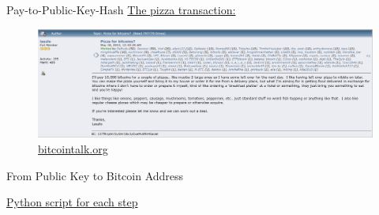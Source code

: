 \documentclass[]{beamer}
\begin{document}
%

\begin{frame}{Pay-to-Public-Key-Hash}
	\href{https://blockstream.info/tx/a1075db55d416d3ca199f55b6084e2115b9345e16c5cf302fc80e9d5fbf5d48d}{\link The pizza transaction:}\\
	\begin{figure}
	\includegraphics[scale=0.3]{../assets/images/pizza_blogpost}	
	\caption*{\href{https://bitcointalk.org/index.php?topic=137.0}{\link bitcointalk.org}}
	\end{figure}
\end{frame}

\begin{frame}{From Public Key to Bitcoin Address}
\vspace{-0.5em}
\begin{figure}
	
\end{figure}
\vspace{-1em}
\scriptsize
\href{https://github.com/cifunibas/Bitcoin-Blockchain-Cryptoassets/blob/main/assets/scripts/bitcoin_address.py}{\link Python script for each step} \\
\end{frame}
\end{document}
